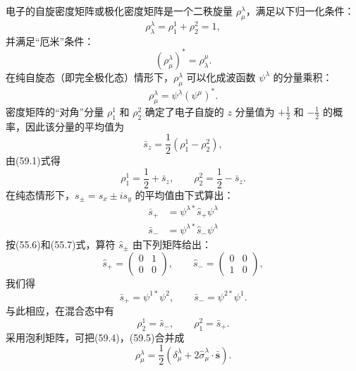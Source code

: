 电子的自旋密度矩阵或极化密度矩阵是一个二秩旋量 $\rho^{\lambda}_{\mu}$，满足以下归一化条件：
\begin{equation}
  \rho^{\lambda}_{\lambda}=\rho^1_1+\rho^2_2=1,
\end{equation}
并满足“厄米”条件：
\begin{equation}
  (\rho^{\lambda}_{\mu})^*=\rho^{\mu}_{\lambda}.
\end{equation}
在纯自旋态（即完全极化态）情形下，$\rho^{\lambda}_{\mu}$ 可以化成波函数 $\psi^{\lambda}$ 的分量乘积：
\begin{equation}
  \rho^{\lambda}_{\mu}=\psi^{\lambda}(\psi^{\mu})^*.
\end{equation}
密度矩阵的“对角”分量 $\rho^1_1$ 和 $\rho^2_2$ 确定了电子自旋的 $z$ 分量值为 $+\frac{1}{2}$ 和 $-\frac{1}{2}$ 的概率，因此该分量的平均值为
\begin{equation*}
  \bar{s}_z=\frac{1}{2}\left(\rho^1_1-\rho^2_2\right),
\end{equation*}
由(59.1)式得
\begin{equation}
  \rho^1_1=\frac{1}{2}+\bar{s}_z,\qquad
  \rho^2_2=\frac{1}{2}-\bar{s}_z.
\end{equation}
在纯态情形下，$s_\pm=s_x\pm is_y$ 的平均值由下式算出：
\begin{equation*}
\begin{aligned}
  \bar{s}_+&=\psi^{\lambda*}\hat{s}_+\psi^{\lambda}\\
  \bar{s}_-&=\psi^{\lambda*}\hat{s}_-\psi^{\lambda}
\end{aligned}
\end{equation*}
按(55.6)和(55.7)式，算符 $\hat{s}_{\pm}$ 由下列矩阵给出：
\begin{equation*}
  \hat{s}_+=\left(\begin{array}{cc}0&1\\0&0\end{array}\right),\qquad
  \hat{s}_-=\left(\begin{array}{cc}0&0\\1&0\end{array}\right),
\end{equation*}
我们得
\begin{equation*}
  \bar{s}_+=\psi^{1*}\psi^2,\qquad
  \bar{s}_-=\psi^{2*}\psi^1.
\end{equation*}
与此相应，在混合态中有
\begin{equation}
  \rho^1_2=\bar{s}_-,\qquad \rho^2_1=\bar{s}_+.
\end{equation}
采用泡利矩阵，可把(59.4)，(59.5)合并成
\begin{equation}
  \rho^{\lambda}_{\mu}=\frac{1}{2}
  \left(\delta^{\lambda}_{\mu}+2\hat{\sigma}^{\lambda}_{\mu}\cdot\bar{\boldsymbol{s}}\right).
\end{equation}
